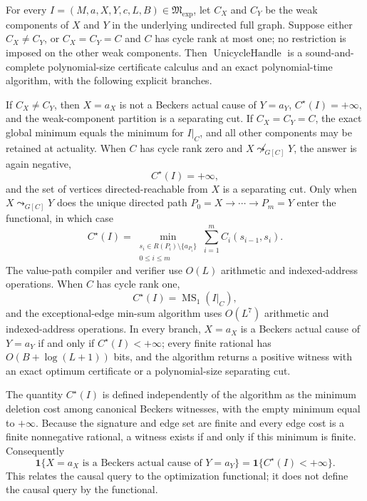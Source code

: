 For every \(I=(M,a,X,Y,c,L,B)\in\mathfrak M_{\mathrm{exp}}\), let \(C_X\) and \(C_Y\) be the weak components of \(X\) and \(Y\) in the underlying undirected full graph.  Suppose either \(C_X\ne C_Y\), or \(C_X=C_Y=C\) and \(C\) has cycle rank at most one; no restriction is imposed on the other weak components.  Then \(\operatorname{UnicycleHandle}\) is a sound-and-complete polynomial-size certificate calculus and an exact polynomial-time algorithm, with the following explicit branches.

If \(C_X\ne C_Y\), then \(X=a_X\) is not a Beckers actual cause of \(Y=a_Y\), \(C^\star(I)=+\infty\), and the weak-component partition is a separating cut.  If \(C_X=C_Y=C\), the exact global minimum equals the minimum for \(I|_C\), and all other components may be retained at actuality.  When \(C\) has cycle rank zero and \(X\not\leadsto_{G[C]}Y\), the answer is again negative,
\[
 C^\star(I)=+\infty,
\]
and the set of vertices directed-reachable from \(X\) is a separating cut.  Only when \(X\leadsto_{G[C]}Y\) does the unique directed path \(P_0=X\to\cdots\to P_m=Y\) enter the functional, in which case
\[
 C^\star(I)
 =\min_{\substack{s_i\in R(P_i)\setminus\{a_{P_i}\}\\0\le i\le m}}
   \sum_{i=1}^{m} C_i(s_{i-1},s_i).
\]
The value-path compiler and verifier use \(O(L)\) arithmetic and indexed-address operations.  When \(C\) has cycle rank one,
\[
 C^\star(I)=\operatorname{MS}_1(I|_C),
\]
and the exceptional-edge min-sum algorithm uses \(O(L^7)\) arithmetic and indexed-address operations.  In every branch, \(X=a_X\) is a Beckers actual cause of \(Y=a_Y\) if and only if \(C^\star(I)<+\infty\); every finite rational has \(O(B+\log(L+1))\) bits, and the algorithm returns a positive witness with an exact optimum certificate or a polynomial-size separating cut.

The quantity \(C^\star(I)\) is defined independently of the algorithm as the minimum deletion cost among canonical Beckers witnesses, with the empty minimum equal to \(+\infty\).  Because the signature and edge set are finite and every edge cost is a finite nonnegative rational, a witness exists if and only if this minimum is finite.  Consequently
\[
 \mathbf 1\{X=a_X\text{ is a Beckers actual cause of }Y=a_Y\}
 =\mathbf 1\{C^\star(I)<+\infty\}.                                      \tag{1}
\]
This relates the causal query to the optimization functional; it does not define the causal query by the functional.

